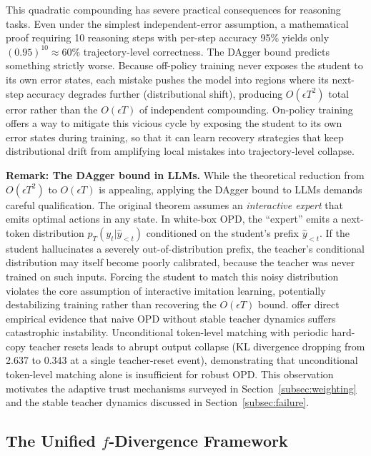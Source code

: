 \documentclass{article} %
\newcommand{\pteacher}{p_T}
\begin{document}
This quadratic compounding has severe practical consequences for reasoning tasks. Even under the simplest independent-error assumption, a mathematical proof requiring 10 reasoning steps with per-step accuracy 95\% yields only $(0.95)^{10} \approx 60\%$ trajectory-level correctness. The DAgger bound predicts something strictly worse. Because off-policy training never exposes the student to its own error states, each mistake pushes the model into regions where its next-step accuracy degrades further (distributional shift), producing $O(\epsilon T^2)$ total error rather than the $O(\epsilon T)$ of independent compounding. On-policy training offers a way to mitigate this vicious cycle by exposing the student to its own error states during training, so that it can learn recovery strategies that keep distributional drift from amplifying local mistakes into trajectory-level collapse.

\textbf{Remark: The DAgger bound in LLMs.} While the theoretical reduction from $O(\epsilon T^2)$ to $O(\epsilon T)$ is appealing, applying the DAgger bound to LLMs demands careful qualification. The original theorem assumes an \emph{interactive expert} that emits optimal actions in any state. In white-box OPD, the ``expert'' emits a next-token distribution $\pteacher(y_t | \hat{y}_{<t})$ conditioned on the student's prefix $\hat{y}_{<t}$. If the student hallucinates a severely out-of-distribution prefix, the teacher's conditional distribution may itself become poorly calibrated, because the teacher was never trained on such inputs. Forcing the student to match this noisy distribution violates the core assumption of interactive imitation learning, potentially destabilizing training rather than recovering the $O(\epsilon T)$ bound. \citet{ttopd2026} offer direct empirical evidence that naive OPD without stable teacher dynamics suffers catastrophic instability. Unconditional token-level matching with periodic hard-copy teacher resets leads to abrupt output collapse (KL divergence dropping from 2.637 to 0.343 at a single teacher-reset event), demonstrating that unconditional token-level matching alone is insufficient for robust OPD. This observation motivates the adaptive trust mechanisms surveyed in Section~\ref{subsec:weighting} and the stable teacher dynamics discussed in Section~\ref{subsec:failure}.

\subsection{The Unified \texorpdfstring{$f$}{f}-Divergence Framework}
\label{subsec:f-div}
\end{document}
